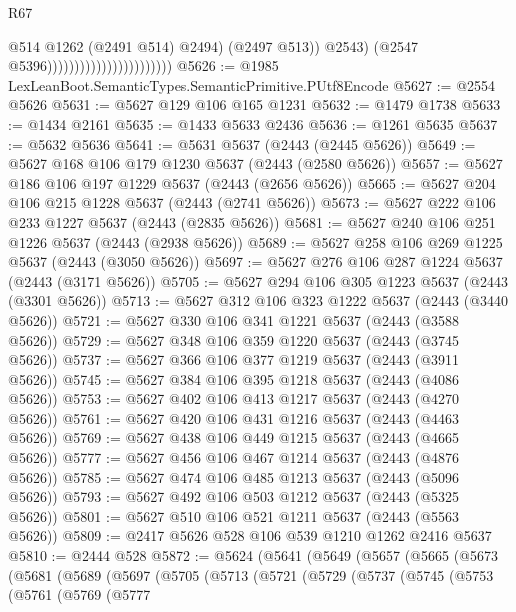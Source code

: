 \begin{lexlean}{R67}
\begin{coremodule}
                                                      @514
                                                      @1262
                                                      (@2491 @514)
                                                      @2494)
                                                    (@2497 @513))
                                                  @2543)
                                                (@2547 @5396)))))))))))))))))))))))
@5626 := @1985 LexLeanBoot.SemanticTypes.SemanticPrimitive.PUtf8Encode
@5627 := @2554 @5626
@5631 := @5627 @129 @106 @165 @1231
@5632 := @1479 @1738
@5633 := @1434 @2161
@5635 := @1433 @5633 @2436
@5636 := @1261 @5635
@5637 := @5632 @5636
@5641 := @5631 @5637 (@2443 (@2445 @5626))
@5649 := @5627 @168 @106 @179 @1230 @5637 (@2443 (@2580 @5626))
@5657 := @5627 @186 @106 @197 @1229 @5637 (@2443 (@2656 @5626))
@5665 := @5627 @204 @106 @215 @1228 @5637 (@2443 (@2741 @5626))
@5673 := @5627 @222 @106 @233 @1227 @5637 (@2443 (@2835 @5626))
@5681 := @5627 @240 @106 @251 @1226 @5637 (@2443 (@2938 @5626))
@5689 := @5627 @258 @106 @269 @1225 @5637 (@2443 (@3050 @5626))
@5697 := @5627 @276 @106 @287 @1224 @5637 (@2443 (@3171 @5626))
@5705 := @5627 @294 @106 @305 @1223 @5637 (@2443 (@3301 @5626))
@5713 := @5627 @312 @106 @323 @1222 @5637 (@2443 (@3440 @5626))
@5721 := @5627 @330 @106 @341 @1221 @5637 (@2443 (@3588 @5626))
@5729 := @5627 @348 @106 @359 @1220 @5637 (@2443 (@3745 @5626))
@5737 := @5627 @366 @106 @377 @1219 @5637 (@2443 (@3911 @5626))
@5745 := @5627 @384 @106 @395 @1218 @5637 (@2443 (@4086 @5626))
@5753 := @5627 @402 @106 @413 @1217 @5637 (@2443 (@4270 @5626))
@5761 := @5627 @420 @106 @431 @1216 @5637 (@2443 (@4463 @5626))
@5769 := @5627 @438 @106 @449 @1215 @5637 (@2443 (@4665 @5626))
@5777 := @5627 @456 @106 @467 @1214 @5637 (@2443 (@4876 @5626))
@5785 := @5627 @474 @106 @485 @1213 @5637 (@2443 (@5096 @5626))
@5793 := @5627 @492 @106 @503 @1212 @5637 (@2443 (@5325 @5626))
@5801 := @5627 @510 @106 @521 @1211 @5637 (@2443 (@5563 @5626))
@5809 := @2417 @5626 @528 @106 @539 @1210 @1262 @2416 @5637
@5810 := @2444 @528
@5872 := @5624
    (@5641
      (@5649
        (@5657
          (@5665
            (@5673
              (@5681
                (@5689
                  (@5697
                    (@5705
                      (@5713
                        (@5721
                          (@5729
                            (@5737
                              (@5745
                                (@5753
                                  (@5761
                                    (@5769
                                      (@5777

\end{coremodule}
\end{lexlean}
